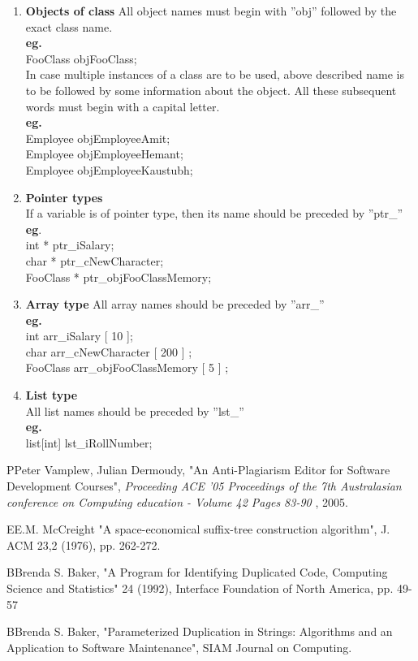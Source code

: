 \documentclass[11pt]{article}
\begin{document}
\begin{enumerate}
\item \textbf{Objects of class}
All object names must begin with ''obj'' followed by the exact class name.\\
\textbf{eg.} \\
FooClass objFooClass;\\
In   case   multiple   instances   of  a   class   are   to   be   used,   above   described   name   is   to   be   followed   by   some information about the object. All these subsequent words must begin with a capital letter. \\
\textbf{eg.} \\
Employee objEmployeeAmit;\\
Employee objEmployeeHemant;\\
Employee objEmployeeKaustubh;\\

\item \textbf{Pointer types}\\ 
If a variable is of pointer type, then its name should be preceded by ''ptr\_''\\
\textbf{eg}.\\
int * ptr\_iSalary;\\
char * ptr\_cNewCharacter;\\
FooClass * ptr\_objFooClassMemory;\\

\item \textbf{Array type}
All array names should be preceded by ''arr\_''\\
\textbf{eg.}\\
int arr\_iSalary [ 10 ];\\
char arr\_cNewCharacter [ 200 ] ;\\
FooClass arr\_objFooClassMemory [ 5 ] ;\\

\item {\textbf{List type}}\\
All list names should be preceded by ''lst\_''\\
\textbf{eg.}\\
list[int] lst\_iRollNumber;

  \end{enumerate}

\begin{thebibliography}{1}

\bibitem PPeter Vamplew, Julian Dermoudy, "An Anti-Plagiarism Editor for Software Development Courses", \emph{Proceeding
ACE '05 Proceedings of the 7th Australasian conference on Computing education - Volume 42
Pages 83-90 }, 2005.

\bibitem EE.M. McCreight "A space-economical suffix-tree
construction algorithm", J. ACM 23,2 (1976), pp. 262-272.

\bibitem BBrenda S. Baker, "A Program for Identifying Duplicated Code, Computing Science and
Statistics" 24 (1992), Interface Foundation of North America, pp. 49-57

\bibitem BBrenda S. Baker, "Parameterized Duplication in Strings: Algorithms and an Application to Software Maintenance", SIAM Journal on Computing.

\end{thebibliography}
\end{document}
